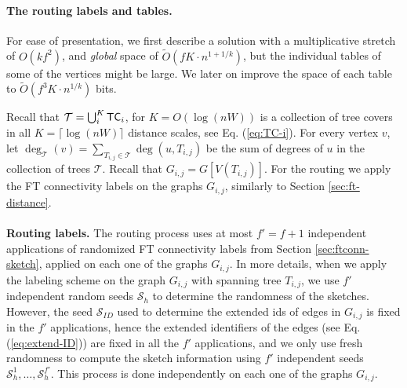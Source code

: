 
\paragraph{The routing labels and tables.} For ease of presentation, we first describe a solution with a multiplicative stretch of $O(kf^2)$, and \emph{global} space of $\widetilde{O}(f K \cdot n^{1+1/k})$, but the individual tables of some of the vertices might be large. We later on improve the space of each table to $\widetilde{O}(f^3 K \cdot n^{1/k})$ bits.

Recall that $\mathcal{T}=\bigcup_i^{K} \mathsf{TC}_i$, for $K=O(\log (nW))$ is a collection of tree covers in all $K=\lceil \log (nW) \rceil$ distance scales, see Eq. (\ref{eq:TC-i}). For every vertex $v$, let $\deg_{\mathcal{T}}(v)=\sum_{T_{i,j} \in \mathcal{T}}\deg(u,T_{i,j})$ be the sum of degrees of $u$ in the collection of trees  $\mathcal{T}$. Recall that $G_{i,j}=G[V(T_{i,j})]$.
For the routing we apply the FT connectivity labels on the graphs $G_{i,j}$, similarly to Section \ref{sec:ft-distance}. 
\\ \\
\noindent \textbf{Routing labels.} The routing process uses at most $f'=f+1$ independent applications of randomized FT connectivity labels from Section 
\ref{sec:ftconn-sketch}, applied on each one of the graphs $G_{i,j}$. 
In more details, when we apply the labeling scheme on the graph $G_{i,j}$ with spanning tree $T_{i,j}$, we use $f'$ independent random seeds $\mathcal{S}_h$ to determine the randomness of the sketches. 
However, the seed $\mathcal{S}_{ID}$ used to determine the extended ids of edges in $G_{i,j}$ is fixed in the $f'$ applications, hence the extended identifiers of the edges (see Eq. (\ref{eq:extend-ID})) are fixed in all the $f'$ applications, and we only use fresh randomness to compute the sketch information using $f'$ independent seeds $\mathcal{S}^1_h,\ldots, \mathcal{S}^{f'}_h$. 
This process is done independently on each one of the graphs $G_{i,j}$. 

